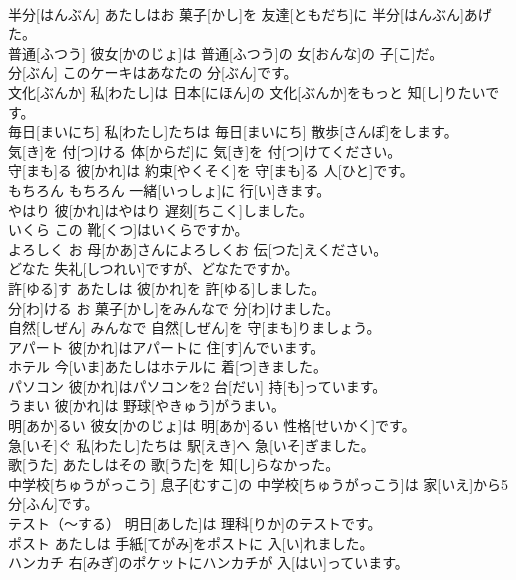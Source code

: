 \documentclass[8pt]{extreport}
\begin{document}
\begin{CJK}{UTF8}{min}
\\	半分[はんぶん]	あたしはお 菓子[かし]を 友達[ともだち]に 半分[はんぶん]あげた。		
\\	普通[ふつう]	彼女[かのじょ]は 普通[ふつう]の 女[おんな]の 子[こ]だ。		
\\	分[ぶん]	このケーキはあなたの 分[ぶん]です。		
\\	文化[ぶんか]	私[わたし]は 日本[にほん]の 文化[ぶんか]をもっと 知[し]りたいです。		
\\	毎日[まいにち]	私[わたし]たちは 毎日[まいにち] 散歩[さんぽ]をします。		
\\	気[き]を 付[つ]ける	体[からだ]に 気[き]を 付[つ]けてください。		
\\	守[まも]る	彼[かれ]は 約束[やくそく]を 守[まも]る 人[ひと]です。		
\\	もちろん	もちろん 一緒[いっしょ]に 行[い]きます。		
\\	やはり	彼[かれ]はやはり 遅刻[ちこく]しました。		
\\	いくら	この 靴[くつ]はいくらですか。		
\\	よろしく	お 母[かあ]さんによろしくお 伝[つた]えください。		
\\	どなた	失礼[しつれい]ですが、どなたですか。		
\\	許[ゆる]す	あたしは 彼[かれ]を 許[ゆる]しました。		
\\	分[わ]ける	お 菓子[かし]をみんなで 分[わ]けました。		
\\	自然[しぜん]	みんなで 自然[しぜん]を 守[まも]りましょう。		
\\	アパート	彼[かれ]はアパートに 住[す]んでいます。		
\\	ホテル	今[いま]あたしはホテルに 着[つ]きました。		
\\	パソコン	彼[かれ]はパソコンを2 台[だい] 持[も]っています。		
\\	うまい	彼[かれ]は 野球[やきゅう]がうまい。		
\\	明[あか]るい	彼女[かのじょ]は 明[あか]るい 性格[せいかく]です。		
\\	急[いそ]ぐ	私[わたし]たちは 駅[えき]へ 急[いそ]ぎました。		
\\	歌[うた]	あたしはその 歌[うた]を 知[し]らなかった。		
\\	中学校[ちゅうがっこう]	息子[むすこ]の 中学校[ちゅうがっこう]は 家[いえ]から5 分[ふん]です。		
\\	テスト（～する）	明日[あした]は 理科[りか]のテストです。		
\\	ポスト	あたしは 手紙[てがみ]をポストに 入[い]れました。		
\\	ハンカチ	右[みぎ]のポケットにハンカチが 入[はい]っています。		

\end{CJK}
\end{document}
